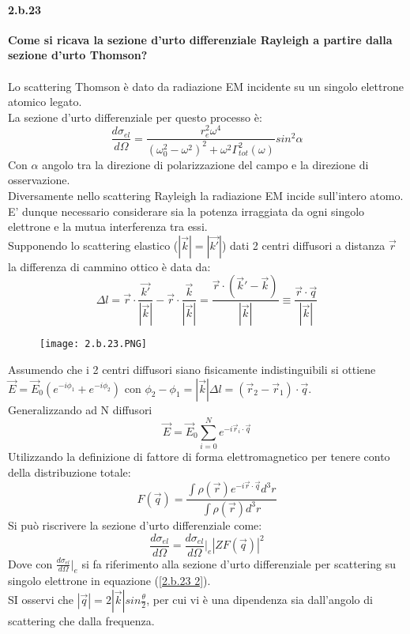 \documentclass[twoside]{article}
\begin{document}
\paragraph{2.b.23}\textbf{Come si ricava la sezione d'urto differenziale Rayleigh a partire dalla sezione d'urto Thomson?}\\ \\
Lo scattering Thomson è dato da radiazione EM incidente su un singolo elettrone atomico legato.\\
La sezione d'urto differenziale per questo processo è:
\begin{equation}\label{2.b.23 1}
    \frac{d\sigma_{el}}{d\Omega}=\frac{r_e^2\omega^4}{(\omega_0^2-\omega^2)^2+\omega^2\Gamma^2_{tot}(\omega)}sin^2\alpha
\end{equation}
Con $\alpha$ angolo tra la direzione di polarizzazione del campo e la direzione di osservazione.
\\
Diversamente nello scattering Rayleigh la radiazione EM incide sull'intero atomo. E' dunque necessario considerare sia la potenza irraggiata da ogni singolo elettrone e la mutua interferenza tra essi.\\
Supponendo lo scattering elastico ($|\vec{k}|=|\vec{k'}|$) dati 2 centri diffusori a distanza $\vec{r}$ la differenza di cammino ottico è data da:
\begin{equation}
    \Delta l=\vec{r}\cdot\frac{\vec{k'}}{|\vec{k}|}-\vec{r}\cdot\frac{\vec{k}}{|\vec{k}|}=\frac{\vec{r}\cdot(\vec{k}'-\vec{k})}{|\vec{k}|}\equiv \frac{\vec{r}\cdot\vec{q}}{|\vec{k}|}
\end{equation}
\begin{figure}[H]
    \centering
    \texttt{[image: 2.b.23.PNG]}
    \label{2.b.23}
\end{figure}
Assumendo che i 2 centri diffusori siano fisicamente indistinguibili si ottiene $\vec{E}=\vec{E}_0(e^{-i\phi_1}+e^{-i\phi_2})$ con $\phi_2-\phi_1=|\vec{k}|\Delta l=(\vec{r}_2-\vec{r}_1)\cdot \vec{q}$.\\
Generalizzando ad N diffusori
\begin{equation}
    \vec{E}=\vec{E}_0\sum_{i=0}^N e^{-i\vec{r}_i\cdot\vec{q}}
\end{equation}
Utilizzando la definizione di fattore di forma elettromagnetico per tenere conto della distribuzione totale:
\begin{equation}
    F(\vec{q})=\frac{\int \rho(\vec{r})e^{-i\vec{r}\cdot \vec{q}}d^3r}{\int \rho(\vec{r})d^3r}
\end{equation}
Si può riscrivere la sezione d'urto differenziale come:
\begin{equation}\label{2.b.23 2}
    \frac{d\sigma_{el}}{d\Omega}=\frac{d\sigma_{el}}{d\Omega}\biggl|_e|ZF(\vec{q})|^2
\end{equation}
Dove con $\frac{d\sigma_{el}}{d\Omega}\biggl|_e$ si fa riferimento alla sezione d'urto differenziale per scattering su singolo elettrone in equazione (\ref{2.b.23 2}).\\
SI osservi che $|\vec{q}|=2|\vec{k}|sin\frac{\theta}{2}$, per cui vi è una dipendenza sia dall'angolo di scattering che dalla frequenza.\\
\newpage
\end{document}
